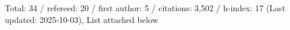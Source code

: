 Total: 34 / refereed: 20 / first author: 5 / citations: 3,502 / h-index: 17 (Last updated: 2025-10-03), List attached below